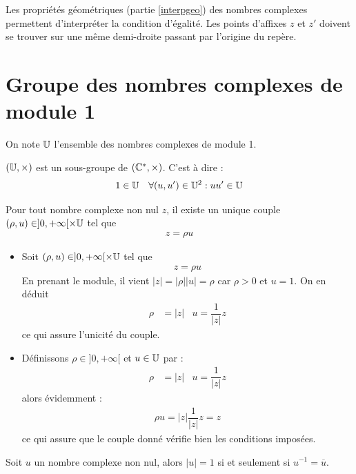 \begin{rem}
 Les propriétés géométriques (partie \ref{interpgeo}) des nombres complexes permettent d'interpréter la condition d'égalité. Les points d'affixes $z$ et $z'$ doivent se trouver sur une même demi-droite passant par l'origine du repère. 
\end{rem}

\section{Groupe des nombres complexes de module 1}
On note $\mathbb{U}$ l'ensemble des nombres complexes de module 1.
\begin{prop}
 $(\mathbb{U},\times)$ est un sous-groupe de $(\mathbb{C}^*,\times)$. C'est à dire :
\begin{align*}
 1 \in \mathbb{U}  & &
\forall (u,u^\prime) \in \mathbb{U}^2 : uu^\prime \in \mathbb{U} 
\end{align*}
\end{prop}
\begin{prop}
 Pour tout nombre complexe non nul $z$, il existe un unique couple $(\rho,u)\in ]0,+\infty[\times \mathbb{U}$ tel que 
\begin{align*}
 z = \rho u
\end{align*}
\end{prop}
\begin{demo}
 \begin{itemize}
 \item[Analyse:] Soit $(\rho,u)\in ]0,+\infty[\times \mathbb{U}$ tel que 
\begin{align*}
 z = \rho u
\end{align*}
En prenant le module, il vient $|z| = |\rho||u|=\rho$ car $\rho >0$ et $u=1$. On en déduit 
\begin{align*}
 \rho& = |z|& u=\dfrac{1}{|z|}z
\end{align*}
ce qui assure l'unicité du couple.
\item[Synthèse:] Définissons $\rho\in ]0,+\infty[$ et $u\in\mathbb{U}$ par :
\begin{align*}
 \rho& = |z|& u=\dfrac{1}{|z|}z
\end{align*}
alors évidemment :
\begin{align*}
 \rho u = |z|\dfrac{1}{|z|}z = z
\end{align*}
ce qui assure que le couple donné vérifie bien les conditions imposées.
\end{itemize}
\end{demo}
\begin{rem}
  Soit $u$ un nombre complexe non nul, alors $|u|=1$ si et seulement si $u^{-1}=\overline{u}$.
\end{rem}

